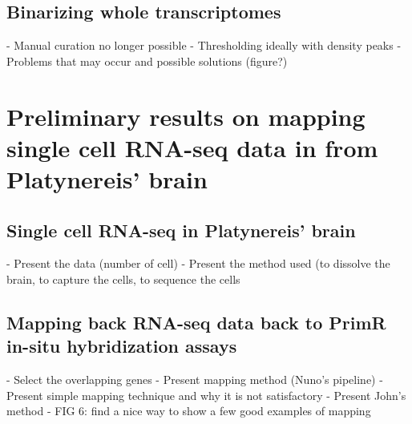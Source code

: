   \subsection*{Binarizing whole transcriptomes}
    - Manual curation no longer possible
    - Thresholding ideally with density peaks
    - Problems that may occur and possible solutions (figure?)

\section{Preliminary results on mapping single cell RNA-seq data in from Platynereis' brain}
  \subsection*{Single cell RNA-seq in Platynereis' brain}
    - Present the data (number of cell)
    - Present the method used (to dissolve the brain, to capture the cells, to sequence the cells
  \subsection*{Mapping back RNA-seq data back to PrimR in-situ hybridization assays}
    - Select the overlapping genes
    - Present mapping method (Nuno's pipeline)
    - Present simple mapping technique and why it is not satisfactory
    - Present John's method  
    - FIG 6: find a nice way to show a few good examples of mapping

